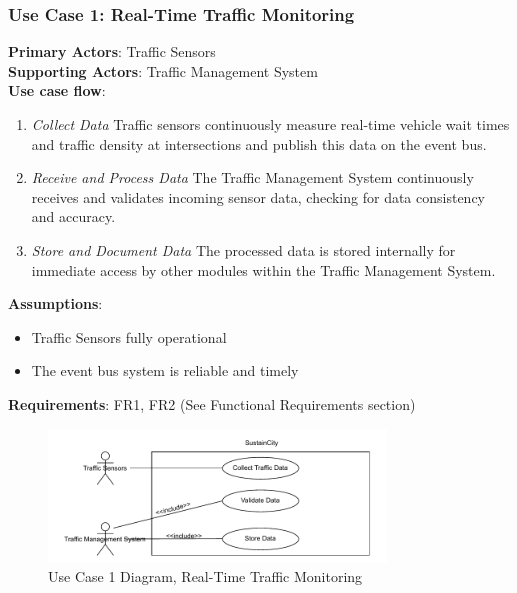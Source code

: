 \documentclass[a4paper,12pt]{article}
\begin{document}
\subsubsection*{Use Case 1: Real-Time Traffic Monitoring}
\textbf{Primary Actors}: Traffic Sensors \\
\textbf{Supporting Actors}: Traffic Management System \\
\textbf{Use case flow}: 
\begin{enumerate}
    \item \textit{Collect Data} Traffic sensors continuously measure real-time vehicle wait times and traffic density at intersections and publish this data on the event bus.
    \item \textit{Receive and Process Data} The Traffic Management System continuously receives and validates incoming sensor data, checking for data consistency and accuracy.
    \item \textit{Store and Document Data} The processed data is stored internally for immediate access by other modules within the Traffic Management System.
\end{enumerate}
\textbf{Assumptions}: 
\begin{itemize}
    \item Traffic Sensors  fully operational
    \item The event bus system is reliable and timely \\
\end{itemize}
\textbf{Requirements}: FR1, FR2 (See Functional Requirements section)
\\
\begin{figure}[h]
    \centering
    \includegraphics[width=0.8\textwidth]{diagrams/Real-Time_Traffic_Monitoring.drawio.pdf}
    \caption{Use Case 1 Diagram, Real-Time Traffic Monitoring}
    \label{fig:Real-Time_Traffic_Monitoring.drawio}
\end{figure}
\\
\end{document}

